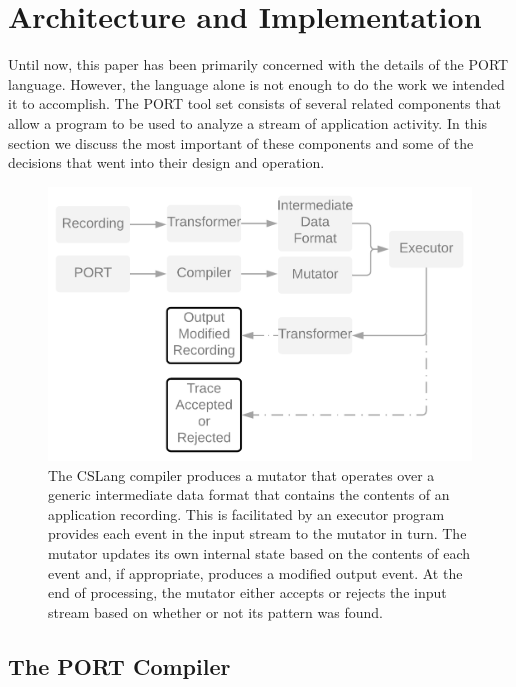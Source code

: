\section{Architecture and Implementation}

Until now, this paper has been primarily concerned with the details of the
PORT language.  However, the language alone is not enough to do the work
we intended it to accomplish.  The PORT tool set
consists of several related
components that allow a program to be used to analyze a stream of
application activity.
In this section we discuss the most important of these components and some
of the decisions that went into their design and operation.

\label{SEC:architecture}

\begin{figure}
  \includegraphics[scale=.19]{images/architecture}
  \caption{The CSLang compiler produces a mutator that operates over a
  generic intermediate data format that contains the contents of an application
  recording.  This is facilitated by an executor program provides each
  event in the input stream to the mutator in turn.  The mutator updates
  its own internal state based on the contents of each event and, if
  appropriate, produces a modified output event.  At the end of processing,
  the mutator either accepts or rejects the input stream based on whether
  or not its pattern was found.}
  \label{fig:architecture}
\end{figure}

\subsection{The PORT Compiler}

